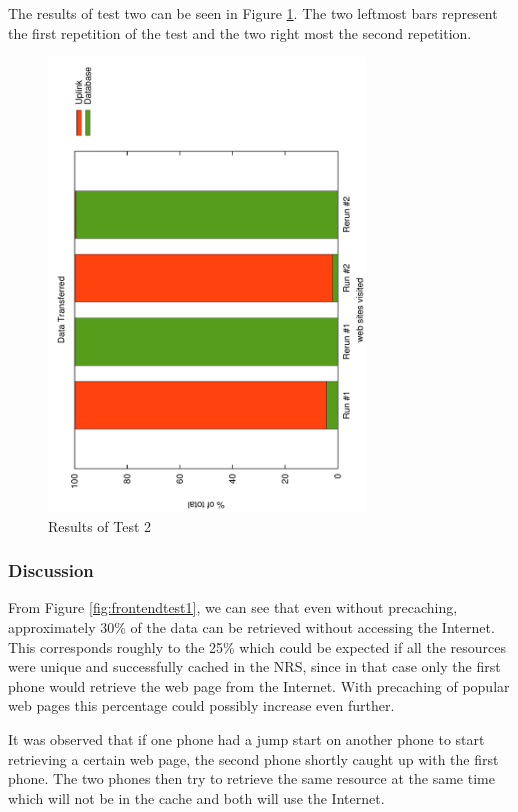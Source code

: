 The results of test two can be seen in Figure \ref{fig:frontendtest2}. The two leftmost bars represent the first repetition of the test and the two right most the second repetition.

\begin{figure}
	\centering
		\includegraphics[width=0.75\textwidth, angle=-90]{./img/rerun.pdf}
    	\caption{Results of Test 2}
	\label{fig:frontendtest2}
\end{figure}

\subsubsection{Discussion}

From Figure \ref{fig:frontendtest1}, we can see that even without precaching, approximately 30\% of the data can be retrieved without accessing the Internet. This corresponds roughly to the 25\% which could be expected if all the resources were unique and successfully cached in the NRS, since in that case only the first phone would retrieve the web page from the Internet. With precaching of popular web pages this percentage could possibly increase even further.

It was observed that if one phone had a jump start on another phone to start retrieving a certain web page, the second phone shortly caught up with the first phone. The two phones then try to retrieve the same resource at the same time which will not be in the cache and both will use the Internet.

